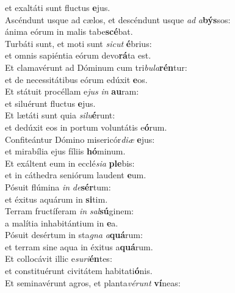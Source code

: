 \oddverse et exaltáti sunt fluctus \textbf{e}jus.\\
\evenverse Ascéndunt usque ad cælos, et descéndunt usque \textit{ad} \textit{a}\textbf{býs}sos:~\*\\
\evenverse ánima eórum in malis tabe\textbf{scé}bat.\\
\oddverse Turbáti sunt, et moti sunt \textit{si}\textit{cut} \textbf{é}brius:~\*\\
\oddverse et omnis sapiéntia eórum devo\textbf{rá}ta est.\\
\evenverse Et clamavérunt ad Dóminum cum tri\textit{bu}\textit{la}\textbf{rén}tur:~\*\\
\evenverse et de necessitátibus eórum edúxit \textbf{e}os.\\
\oddverse Et státuit procéllam e\textit{jus} \textit{in} \textbf{au}ram:~\*\\
\oddverse et siluérunt fluctus \textbf{e}jus.\\
\evenverse Et lætáti sunt quia \textit{si}\textit{lu}\textbf{é}runt:~\*\\
\evenverse et dedúxit eos in portum voluntátis e\textbf{ó}rum.\\
\oddverse Confiteántur Dómino misericór\textit{di}\textit{æ} \textbf{e}jus:~\*\\
\oddverse et mirabília ejus fíliis \textbf{hó}minum.\\
\evenverse Et exáltent eum in ecclé\textit{si}\textit{a} \textbf{ple}bis:~\*\\
\evenverse et in cáthedra seniórum laudent \textbf{e}um.\\
\oddverse Pósuit flúmina \textit{in} \textit{de}\textbf{sér}tum:~\*\\
\oddverse et éxitus aquárum in \textbf{si}tim.\\
\evenverse Terram fructíferam \textit{in} \textit{sal}\textbf{sú}ginem:~\*\\
\evenverse a malítia inhabitántium in \textbf{e}a.\\
\oddverse Pósuit desértum in sta\textit{gna} \textit{a}\textbf{quá}rum:~\*\\
\oddverse et terram sine aqua in éxitus a\textbf{quá}rum.\\
\evenverse Et collocávit illic e\textit{su}\textit{ri}\textbf{én}tes:~\*\\
\evenverse et constituérunt civitátem habitati\textbf{ó}nis.\\
\oddverse Et seminavérunt agros, et planta\textit{vé}\textit{runt} \textbf{ví}neas:~\*\\
